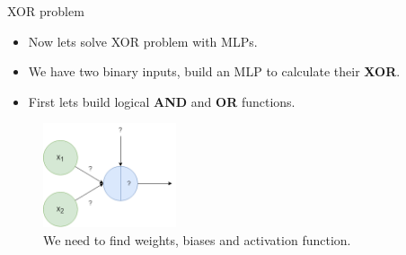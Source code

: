 \begin{frame}{XOR problem}
    \begin{itemize}
        \item Now lets solve XOR problem with MLPs.
        \item We have two binary inputs, build an MLP to calculate their \textbf{XOR}.
        \medskip
        \medskip
        \item First lets build logical \textbf{AND} and \textbf{OR} functions.
    \end{itemize}
    \begin{figure}[H]
        \centering
        \includegraphics[width=0.35\textwidth]{Figs/solve_and_or_gate.png}
        \caption{We need to find weights, biases and activation function.}
    \end{figure}
\end{frame}

